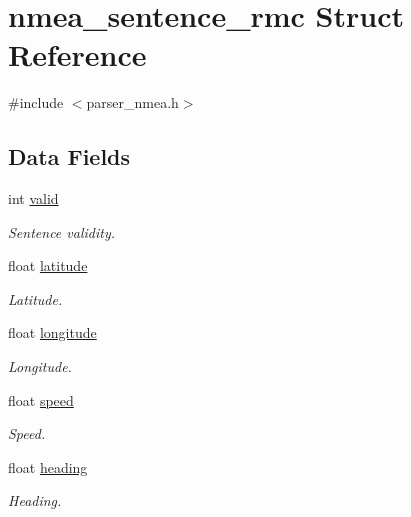 \hypertarget{structnmea__sentence__rmc}{}\section{nmea\+\_\+sentence\+\_\+rmc Struct Reference}
\label{structnmea__sentence__rmc}


{\ttfamily \#include $<$parser\+\_\+nmea.\+h$>$}

\subsection*{Data Fields}
\begin{DoxyCompactItemize}
\item 
int \hyperlink{structnmea__sentence__rmc_ac63b1f168765a53e565a8ba27f5469d1}{valid}\hypertarget{structnmea__sentence__rmc_ac63b1f168765a53e565a8ba27f5469d1}{}\label{structnmea__sentence__rmc_ac63b1f168765a53e565a8ba27f5469d1}

\begin{DoxyCompactList}\small\item\em Sentence validity. \end{DoxyCompactList}\item 
float \hyperlink{structnmea__sentence__rmc_ad9e643bc6bd5a62b9b5011cf1c93629e}{latitude}\hypertarget{structnmea__sentence__rmc_ad9e643bc6bd5a62b9b5011cf1c93629e}{}\label{structnmea__sentence__rmc_ad9e643bc6bd5a62b9b5011cf1c93629e}

\begin{DoxyCompactList}\small\item\em Latitude. \end{DoxyCompactList}\item 
float \hyperlink{structnmea__sentence__rmc_a006303577d6adb772761727538b74f80}{longitude}\hypertarget{structnmea__sentence__rmc_a006303577d6adb772761727538b74f80}{}\label{structnmea__sentence__rmc_a006303577d6adb772761727538b74f80}

\begin{DoxyCompactList}\small\item\em Longitude. \end{DoxyCompactList}\item 
float \hyperlink{structnmea__sentence__rmc_a7f7e4724cf57d59513b39c5ecc81adc8}{speed}\hypertarget{structnmea__sentence__rmc_a7f7e4724cf57d59513b39c5ecc81adc8}{}\label{structnmea__sentence__rmc_a7f7e4724cf57d59513b39c5ecc81adc8}

\begin{DoxyCompactList}\small\item\em Speed. \end{DoxyCompactList}\item 
float \hyperlink{structnmea__sentence__rmc_ac5682e48513a771560df50e3b213e61a}{heading}\hypertarget{structnmea__sentence__rmc_ac5682e48513a771560df50e3b213e61a}{}\label{structnmea__sentence__rmc_ac5682e48513a771560df50e3b213e61a}

\begin{DoxyCompactList}\small\item\em Heading. \end{DoxyCompactList}\end{DoxyCompactItemize}



